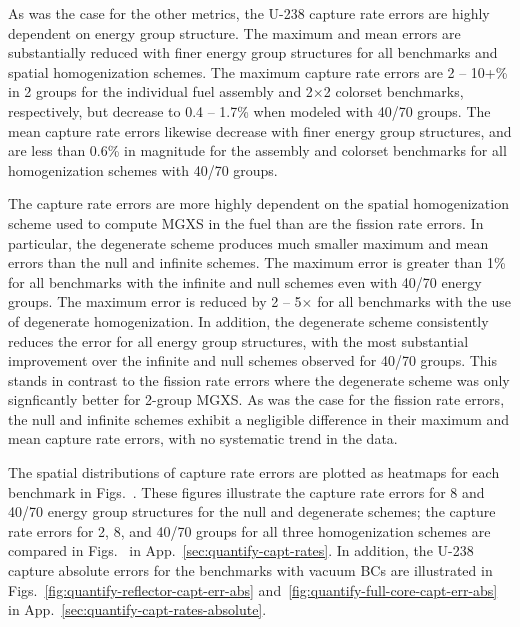 As was the case for the other metrics, the U-238 capture rate errors are highly dependent on energy group structure. The maximum and mean errors are substantially reduced with finer energy group structures for all benchmarks and spatial homogenization schemes. The maximum capture rate errors are 2 -- 10+\% in 2 groups for the individual fuel assembly and 2$\times$2 colorset benchmarks, respectively, but decrease to 0.4 -- 1.7\% when modeled with 40/70 groups. The mean capture rate errors likewise decrease with finer energy group structures, and are less than 0.6\% in magnitude for the assembly and colorset benchmarks for all homogenization schemes with 40/70 groups.

The capture rate errors are more highly dependent on the spatial homogenization scheme used to compute \ac{MGXS} in the fuel than are the fission rate errors. In particular, the degenerate scheme produces much smaller maximum and mean errors than the null and infinite schemes. The maximum error is greater than 1\% for all benchmarks with the infinite and null schemes even with 40/70 energy groups. The maximum error is reduced by 2 -- 5$\times$ for all benchmarks with the use of degenerate homogenization. In addition, the degenerate scheme consistently reduces the error for all energy group structures, with the most substantial improvement over the infinite and null schemes observed for 40/70 groups. This stands in contrast to the fission rate errors where the degenerate scheme was only signficantly better for 2-group \ac{MGXS}. As was the case for the fission rate errors, the null and infinite schemes exhibit a negligible difference in their maximum and mean capture rate errors, with no systematic trend in the data.

The spatial distributions of capture rate errors are plotted as heatmaps for each benchmark in Figs.~. These figures illustrate the capture rate errors for 8 and 40/70 energy group structures for the null and degenerate schemes; the capture rate errors for 2, 8, and 40/70 groups for all three homogenization schemes are compared in Figs.~ in App.~\ref{sec:quantify-capt-rates}. In addition, the U-238 capture absolute errors for the benchmarks with vacuum \acp{BC} are illustrated in Figs.~\ref{fig:quantify-reflector-capt-err-abs} and~\ref{fig:quantify-full-core-capt-err-abs} in App.~\ref{sec:quantify-capt-rates-absolute}.

